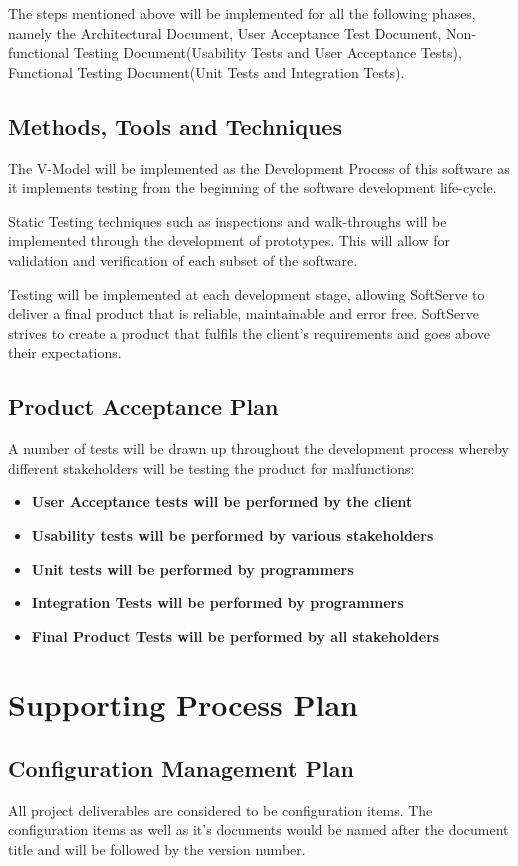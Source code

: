 \documentclass[12pt]{article}
\begin{document}
The steps mentioned above will be implemented for all the following phases, namely the Architectural Document, User Acceptance Test Document, Non-functional Testing Document(Usability Tests and User Acceptance Tests), Functional Testing Document(Unit Tests and Integration Tests).  

\subsection{Methods, Tools and Techniques}
The V-Model will be implemented as the Development Process of this software as it implements testing from the beginning of the software development life-cycle.

Static Testing techniques such as inspections and walk-throughs will be implemented through the development of prototypes. This will allow for validation and verification of each subset of the software.

Testing will be implemented at each development stage, allowing SoftServe to deliver a final product that is reliable, maintainable and error free. SoftServe strives to create a product that fulfils the client's requirements and goes above their expectations.

\subsection{Product Acceptance Plan}
A number of tests will be drawn up throughout the development process whereby different stakeholders will be testing the product for malfunctions:

\begin{itemize}
\item \textbf{User Acceptance tests will be performed by the client }
\item \textbf{Usability tests will be performed by various stakeholders}
\item \textbf{Unit tests will be performed by programmers}
\item \textbf{Integration Tests will be performed by programmers}
\item \textbf{Final Product Tests will be performed by all stakeholders}
\end{itemize}

\section{Supporting Process Plan}

\subsection{Configuration Management Plan}
All project deliverables are considered to be configuration items. The configuration items as well as it's documents would be named after the document title and will be followed by the version number. 
\end{document}
